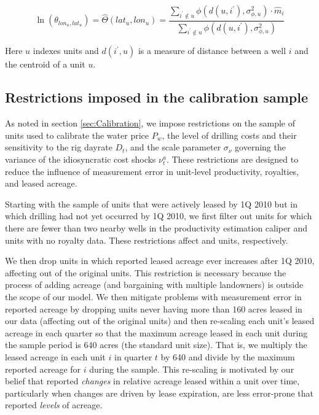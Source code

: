 \documentclass[12pt]{article}
\begin{document}
\begin{equation}
\ln(\theta_{lon_u,lat_u}) = \widehat{\Theta}(lat_u,lon_u) = \dfrac{ \sum_{i^{\prime} \notin u} \phi( d(u, i^{\prime}), \sigma^2_{\phi,u}) \cdot \hat{m}_i  }{ \sum_{i^{\prime} \notin u} \phi( d(u, i^{\prime}), \sigma^2_{\phi,u}) }
\end{equation}

\noindent Here $u$ indexes units and $d(i^{\prime}, u)$ is a measure of distance between a well $i$ and the centroid of a unit $u$.

\subsection{Restrictions imposed in the calibration sample}

As noted in section \ref{sec:Calibration}, we impose restrictions on the sample of units used to calibrate the water price $P_w$, the level of drilling costs and their sensitivity to the rig dayrate $D_t$, and the scale parameter $\sigma_\nu$ governing the variance of the idiosyncratic cost shocks $\nu^a_t$. These restrictions are designed to reduce the influence of measurement error in unit-level productivity, royalties, and leased acreage.

Starting with the sample of units that were actively leased by 1Q 2010 but in which drilling had not yet occurred by 1Q 2010, we first filter out units for which there are fewer than two nearby wells in the productivity estimation caliper and units with no royalty data. These restrictions affect and units, respectively. 

We then drop units in which reported leased acreage ever increases after 1Q 2010, affecting out of the original units. This restriction is necessary because the process of adding acreage (and bargaining with multiple landowners) is outside the scope of our model. We then mitigate problems with measurement error in reported acreage by dropping units never having more than 160 acres leased in our data (affecting out of the original units) and then re-scaling each unit's leased acreage in each quarter so that the maximum acreage leased in each unit during the sample period is 640 acres (the standard unit size). That is, we multiply the leased acreage in each unit $i$ in quarter $t$ by 640 and divide by the maximum reported acreage for $i$ during the sample. This re-scaling is motivated by our belief that reported \emph{changes} in relative acreage leased within a unit over time, particularly when changes are driven by lease expiration, are less error-prone that reported \emph{levels} of acreage.
\end{document}
